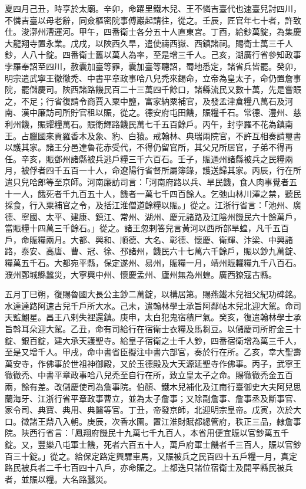 \begin{pinyinscope}
 夏四月己丑，時享於太廟。辛卯，命躍里鐵木兒、王不憐吉臺代也速臺兒討四川，不憐吉臺以母老辭，同僉樞密院事傅巖起請往，從之。壬辰，匠官年七十者，許致仕。浚漷州漕運河。甲午，四番衛士各分五十人直東宮。丁酉，給鈔萬錠，為集慶大龍翔寺置永業。戊戌，以陜西久旱，遣使禱西嶽、西鎮諸祠。賜衛士萬三千人鈔，人八十錠。四番衛士舊以萬人為率，至是增三千人。己亥，湖廣行省參知政事孛羅奉詔至四川，赦囊加臺等罪，囊加臺等聽詔，蜀地悉定，諸省兵皆罷。癸卯，明宗遣武寧王徹徹禿、中書平章政事哈八兒禿來錫命，立帝為皇太子，命仍置詹事院，罷儲慶司。陜西諸路饑民百二十三萬四千餘口，諸縣流民又數十萬，先是嘗賑之，不足；行省復請令商賈入粟中鹽，富家納粟補官，及發孟津倉糧八萬石及河南、漢中廉訪司所貯官租以賑，從之。德安府屯田饑，賑糧千石。常德、澧州、慈利州饑，賑糶糧萬石。賑衛輝路饑民萬七千五百餘戶。丙午，封孛羅不花為鎮南王。占臘國來貢羅香木及象、豹、白猿。戒翰林、典瑞兩院官，不許互相奏請璽書以護其家。諸王分邑達魯花赤受代，不得仍留官所，其父兄所居官，子弟不得再任。辛亥，賑鄧州諸縣被兵逃戶糧三千六百石。壬子，賑通州諸縣被兵之民糧兩月，被俘者四千五百一十人，命遼陽行省督所屬簿錄，護送歸其家。丙辰，行在所遣只兒哈郎等至京師。河南廉訪司言：「河南府路以兵、旱民饑，食人肉事覺者五十一人，餓死者千九百五十人，饑者一萬七千四百餘人。乞弛山林川澤之禁，聽民採食，行入粟補官之令，及括江淮僧道餘糧以賑。」從之。江浙行省言：「池州、廣德、寧國、太平、建康、鎮江、常州、湖州、慶元諸路及江陰州饑民六十餘萬戶，當賑糧十四萬三千餘石。」從之。諸王忽剌答兒言黃河以西所部旱蝗，凡千五百戶，命賑糧兩月。大都、興和、順德、大名、彰德、懷慶、衛輝、汴梁、中興諸路，泰安、高唐、曹、冠、徐、邳諸州，饑民六十七萬六千餘戶，賑以鈔九萬錠、糧萬五千石。大都宛平縣，保定遂州、易州，賑糧一月，靖州賑糶糧九千八百石。濮州鄄城縣蠶災，大寧興中州、懷慶孟州、廬州無為州蝗。廣西獠寇古縣。



 五月丁巳朔，復賜魯國大長公主鈔二萬錠，以構居第。賜燕鐵木兒祖父紀功碑銘。水達達路阿速古兒千戶所大水。己未，遣翰林學士承旨阿鄰帖木兒北迎大駕。命司天監翽星。昌王八剌失裡還鎮。庚申，太白犯鬼宿積尸氣。癸亥，復遣翰林學士承旨斡耳朵迎大駕。乙丑，命有司給行在宿衛士衣糧及馬芻豆。以儲慶司所貯金三十錠、銀百錠，建大承天護聖寺。給皇子宿衛之士千人鈔，四番宿衛增為萬三千人，至是又增千人。甲戌，命中書省臣擬注中書六部官，奏於行在所。乙亥，幸大聖壽萬安寺，作佛事於世祖神御殿，又於玉德殿及大天源延聖寺作佛事。丙子，武寧王徹徹禿、中書平章政事哈八兒禿至自行在所，致立皇太子之命。賜徹徹禿金五百兩，餘有差。改儲慶使司為詹事院。伯顏、鐵木兒補化及江南行臺御史大夫阿兒思蘭海牙、江浙行省平章政事曹立，並為太子詹事；又除副詹事、詹事丞及斷事官、家令司、典寶、典用、典醫等官。丁丑，帝發京師，北迎明宗皇帝。戊寅，次於大口。徵諸王鼎八入朝。庚辰，次香水園。置江淮財賦都總管府，秩正三品，隸詹事院。陜西行省言：「鳳翔府饑民十九萬七千九百人，本省用便宜賑以官鈔萬五千錠。又，豐樂八屯軍士饑，死者六百五十人，萬戶府軍士饑者千三百人，賑以官鈔百三十錠。」從之。給保定路定興驛車馬，又賑被兵之民百四十五戶糧一月，真定路民被兵者二千七百四十八戶，亦命賑之。上都迭只諸位宿衛士及開平縣民被兵者，並賑以糧。大名路蠶災。




\end{pinyinscope}
